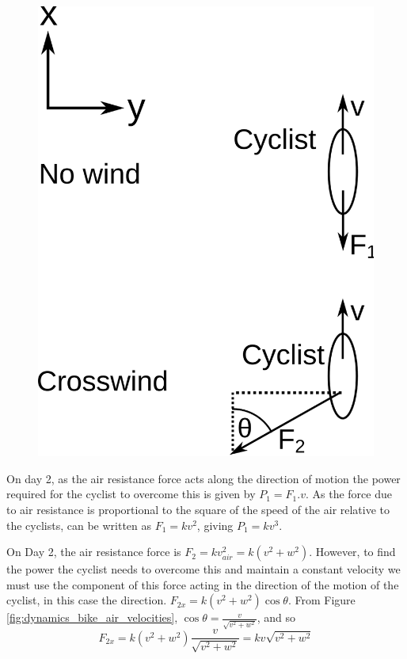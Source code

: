 \begin{problem}
{\begin{enumerate}
\begin{figure}[h]
\centering
\includegraphics[scale =0.5]{../../../figures/dynamics_bike_air_forces.svg}
\caption{}
\label{fig:dynamics_bike_air_forces}
\end{figure}

On day 2, as the air resistance force acts along the direction of motion the power required for the cyclist to overcome this is given by $P_1 = F_1 . v$. As the force due to air resistance is proportional to the square of the speed of the air relative to the cyclists,  can be written as $F_1 = k v^2$, giving $P_1 = k v^3$.

On Day 2, the air resistance force is $F_2 = k v_{air}^2 = k (v^2 + w^2)$. However, to find the power the cyclist needs to overcome this and maintain a constant velocity we must use the component of this force acting in the direction of the motion of the cyclist, in this case the   direction. $F_{2x} = k (v^2 + w^2) \cos \theta$. From Figure  \ref{fig:dynamics_bike_air_velocities}, $ \cos \theta = \frac{v}{\sqrt{v^2 + w^2}}$, and so 
\begin{equation} F_{2x} = k (v^2 + w^2) \frac{v}{\sqrt{v^2 + w^2}} = kv \sqrt{v^2 + w^2}  \end{equation}


\end{enumerate}}
\end{problem}
